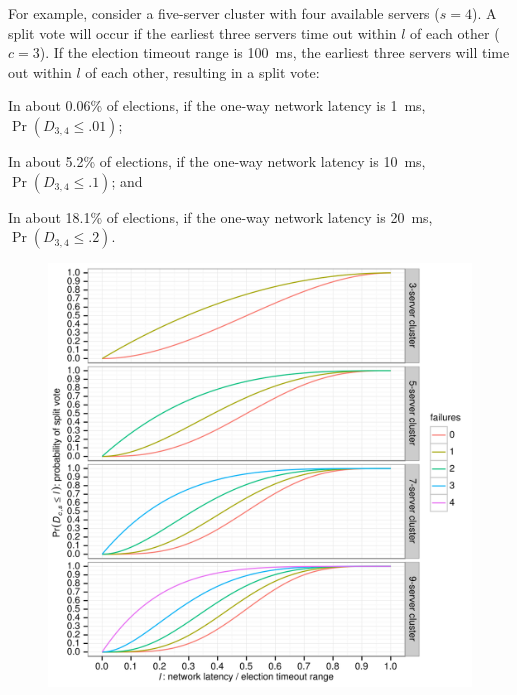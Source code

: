 For example, consider a five-server
cluster with four available servers ($s=4$). A split vote will occur if the
earliest three servers time out within $l$ of each other ($c=3$). If the
election timeout range is \SI{100}{\milli\second},
the earliest three servers will time
out within $l$ of each other, resulting in a split vote:
\begin{compactitem}
\item In about 0.06\% of elections, if the one-way network latency is
\SI{1}{\milli\second},
$\Pr(D_{3,4} \leq .01)$;
\item In about 5.2\% of elections, if the one-way network latency is
\SI{10}{\milli\second}, $\Pr(D_{3,4} \leq .1)$; and
\item In about 18.1\% of elections, if the one-way network latency is
\SI{20}{\milli\second}, $\Pr(D_{3,4} \leq .2)$.
\end{compactitem}

\begin{figure}
\centering
\includegraphics{leaderelection/distance}
\vspace{-2ex}
\label{fig:leaderelection:theory:distance}
\end{figure}


